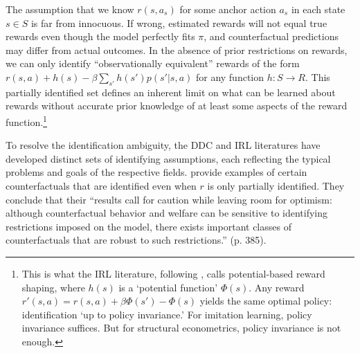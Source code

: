 The assumption that we know $r(s,a_s)$ for some anchor action $a_s$ in each state $s \in S$ is far from innocuous. If wrong, estimated rewards will not equal true rewards even though the model perfectly fits $\pi$, and counterfactual predictions may differ from actual outcomes. In the absence of prior restrictions on rewards, we can only identify ``observationally equivalent'' rewards of the form $r(s,a)+h(s)-\beta \sum_{s'} h(s')p(s'|s,a)$ for any function $h: S \to R$. This partially identified set defines an inherent limit on what can be learned about rewards without accurate prior knowledge of at least some aspects of the reward function.\footnote{\footnotesize This is what the IRL literature, following \citet{nhr:1999}, calls potential-based reward shaping, where $h(s)$ is a `potential function' $\Phi(s)$. Any reward $r'(s,a) = r(s,a) + \beta\Phi(s') - \Phi(s)$ yields the same optimal policy: identification `up to policy invariance.' For imitation learning, policy invariance suffices. But for structural econometrics, policy invariance is not enough.}

To resolve the identification ambiguity, the DDC and IRL literatures have developed distinct sets of identifying assumptions, each reflecting the typical problems and goals of the respective fields. \citet{souza:2021} provide examples of certain counterfactuals that are  identified even when $r$ is
only partially identified. They conclude that their ``results call for caution while leaving room for optimism: 
although counterfactual behavior and welfare can be sensitive to identifying restrictions imposed on the model, 
there exists important classes of counterfactuals that are robust to such restrictions.'' (p. 385).




